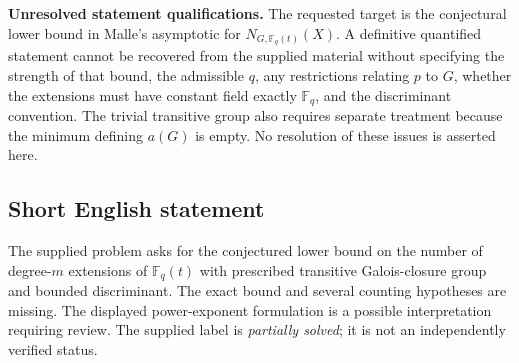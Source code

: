 \documentclass[11pt]{article}
\newcommand{\F}{\mathbb{F}}
\begin{document}
\textbf{Unresolved statement qualifications.} The requested target is the conjectural lower bound in Malle's asymptotic for \(N_{G,\F_q(t)}(X)\). A definitive quantified statement cannot be recovered from the supplied material without specifying the strength of that bound, the admissible \(q\), any restrictions relating \(p\) to \(G\), whether the extensions must have constant field exactly \(\F_q\), and the discriminant convention. The trivial transitive group also requires separate treatment because the minimum defining \(a(G)\) is empty. No resolution of these issues is asserted here.
\subsection{Short English statement}
The supplied problem asks for the conjectured lower bound on the number of degree-\(m\) extensions of \(\F_q(t)\) with prescribed transitive Galois-closure group and bounded discriminant. The exact bound and several counting hypotheses are missing. The displayed power-exponent formulation is a possible interpretation requiring review. The supplied label is \emph{partially solved}; it is not an independently verified status.
\end{document}
